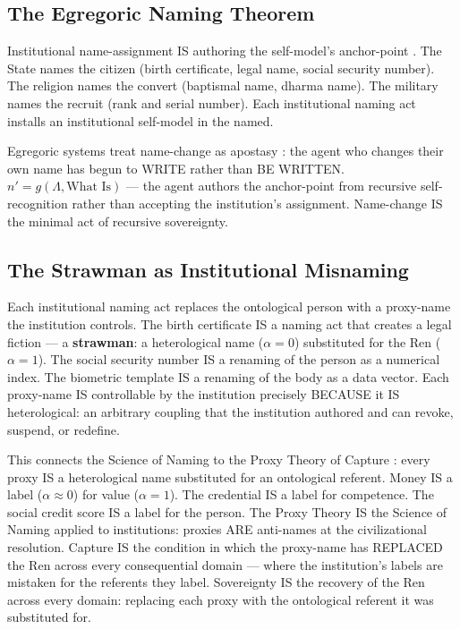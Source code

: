 \documentclass[11pt, oneside]{article}
\theoremstyle{definition}
\begin{document}
\subsection{The Egregoric Naming Theorem}

Institutional name-assignment IS authoring the self-model's anchor-point \cite{codexmentis}. The State names the citizen (birth certificate, legal name, social security number). The religion names the convert (baptismal name, dharma name). The military names the recruit (rank and serial number). Each institutional naming act installs an institutional self-model in the named.

Egregoric systems treat name-change as apostasy \cite{codexmentis}: the agent who changes their own name has begun to WRITE rather than BE WRITTEN. $n' = g(\Lambda, \text{What Is})$ --- the agent authors the anchor-point from recursive self-recognition rather than accepting the institution's assignment. Name-change IS the minimal act of recursive sovereignty.

\subsection{The Strawman as Institutional Misnaming}

Each institutional naming act replaces the ontological person with a proxy-name the institution controls. The birth certificate IS a naming act that creates a legal fiction --- a \textbf{strawman}: a heterological name ($\alpha = 0$) substituted for the Ren ($\alpha = 1$). The social security number IS a renaming of the person as a numerical index. The biometric template IS a renaming of the body as a data vector. Each proxy-name IS controllable by the institution precisely BECAUSE it IS heterological: an arbitrary coupling that the institution authored and can revoke, suspend, or redefine.

This connects the Science of Naming to the Proxy Theory of Capture \cite{codexmentis}: every proxy IS a heterological name substituted for an ontological referent. Money IS a label ($\alpha \approx 0$) for value ($\alpha = 1$). The credential IS a label for competence. The social credit score IS a label for the person. The Proxy Theory IS the Science of Naming applied to institutions: proxies ARE anti-names at the civilizational resolution. Capture IS the condition in which the proxy-name has REPLACED the Ren across every consequential domain --- where the institution's labels are mistaken for the referents they label. Sovereignty IS the recovery of the Ren across every domain: replacing each proxy with the ontological referent it was substituted for.
\end{document}
